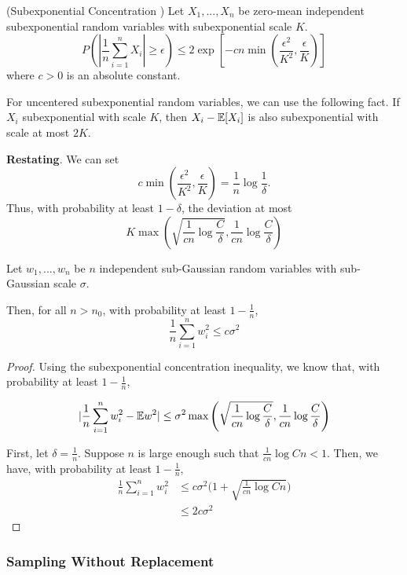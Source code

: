 \begin{proposition} (Subexponential Concentration \cite{vershynin2010introduction})
Let $X_1,...,X_n$ be zero-mean independent subexponential random variables with subexponential scale $K$. 
\[
P( | \frac{1}{n} \sum_{i=1}^n X_i | \geq \epsilon) \leq
	2 \exp \left[ -c n \min\left( \frac{\epsilon^2}{K^2}, \frac{\epsilon}{K} \right) \right]
\]
where $c > 0$ is an absolute constant.
\end{proposition}

For uncentered subexponential random variables, we can use the following fact. If $X_i$ subexponential with scale $K$, then $X_i - {\mathbb E}[X_i]$ is also subexponential with scale at most $2K$.

\textbf{Restating}. We can set
\[
c \min\left( \frac{\epsilon^2}{K^2}, \frac{\epsilon}{K} \right) = \frac{1}{n} \log \frac{1}{\delta}.
\]
Thus, with probability at least $1-\delta$, the deviation at most
\[
K \max\left( \sqrt{\frac{1}{cn} \log \frac{C}{\delta}},  \frac{1}{cn} \log \frac{C}{\delta} \right)
\]


\begin{corollary}
Let $w_1,...,w_n$ be $n$ independent sub-Gaussian random variables with sub-Gaussian scale $\sigma$. 

Then, for all $n > n_0$, with probability at least $1- \frac{1}{n}$,
\[
\frac{1}{n} \sum_{i=1}^n w_i^2 \leq c \sigma^2 
\]
\end{corollary}

\begin{proof}
Using the subexponential concentration inequality, we know that, with probability at least $1-\frac{1}{n}$, 

\[
| \frac{1}{n} \sum_{i=1}^n w_i^2 - {\mathbb E} w^2 | \leq \sigma^2 \max\left( \sqrt{\frac{1}{cn} \log \frac{C}{\delta}}, \frac{1}{cn}\log \frac{C}{\delta} \right)
\]

First, let $\delta = \frac{1}{n}$. Suppose $n$ is large enough such that $ \frac{1}{cn} \log Cn < 1$. Then, we have, with probability at least $1-\frac{1}{n}$,
\begin{align*}
 \frac{1}{n} \sum_{i=1}^n w_i^2 &\leq c\sigma^2 \Big(1+\sqrt{\frac{1}{cn} \log Cn}\Big) \\
		&\leq 2 c \sigma^2
 \end{align*}
 
\end{proof}



\subsubsection{Sampling Without Replacement}

